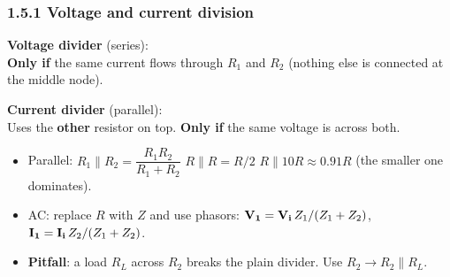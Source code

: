     \subsubsection{1.5.1 Voltage and current division}
    \begin{minipage}[t]{0.49\linewidth}\raggedright
        \textbf{Voltage divider} (series):
        \\
        \textbf{Only if} the same current flows through $R_1$ and $R_2$ (nothing else is connected at the middle node).
    \end{minipage}\hfill
    \begin{minipage}[t]{0.49\linewidth}\raggedright
        \textbf{Current divider} (parallel):
        \\
        Uses the \textbf{other} resistor on top. \textbf{Only if} the same voltage is across both.
    \end{minipage}
    \begin{itemize}
        \item Parallel: $R_1\|R_2 = \dfrac{R_1R_2}{R_1+R_2}$ \quad $R\|R = R/2$ \quad $R\|10R \approx 0.91R$ (the smaller one dominates).
        \item AC: replace $R$ with $Z$ and use phasors: $\mathbf{V_1} = \mathbf{V_i}\,Z_1/(Z_1+Z_2)$, \ $\mathbf{I_1} = \mathbf{I_i}\,Z_2/(Z_1+Z_2)$. 
        \item \textbf{Pitfall}: a load $R_L$ across $R_2$ breaks the plain divider. Use $R_2 \to R_2\|R_L$.
    \end{itemize}

